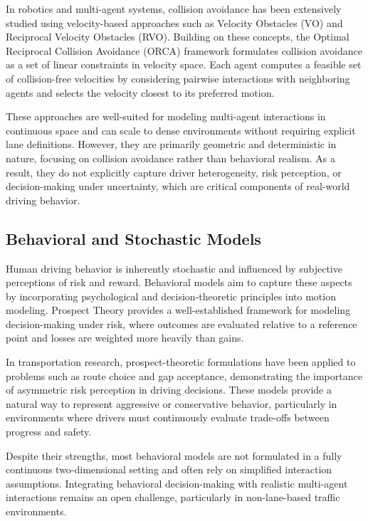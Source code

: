 \documentclass[conference]{IEEEtran}
\begin{document}
In robotics and multi-agent systems, collision avoidance has been extensively studied using velocity-based approaches such as Velocity Obstacles (VO) and Reciprocal Velocity Obstacles (RVO). Building on these concepts, the Optimal Reciprocal Collision Avoidance (ORCA) framework \cite{berg2008reciprocal, berg2011reciprocal} formulates collision avoidance as a set of linear constraints in velocity space. Each agent computes a feasible set of collision-free velocities by considering pairwise interactions with neighboring agents and selects the velocity closest to its preferred motion.

These approaches are well-suited for modeling multi-agent interactions in continuous space and can scale to dense environments without requiring explicit lane definitions. However, they are primarily geometric and deterministic in nature, focusing on collision avoidance rather than behavioral realism. As a result, they do not explicitly capture driver heterogeneity, risk perception, or decision-making under uncertainty, which are critical components of real-world driving behavior.

\subsection{Behavioral and Stochastic Models}
Human driving behavior is inherently stochastic and influenced by subjective perceptions of risk and reward. Behavioral models aim to capture these aspects by incorporating psychological and decision-theoretic principles into motion modeling. Prospect Theory \cite{kahneman1979prospect} provides a well-established framework for modeling decision-making under risk, where outcomes are evaluated relative to a reference point and losses are weighted more heavily than gains.

In transportation research, prospect-theoretic formulations have been applied to problems such as route choice and gap acceptance, demonstrating the importance of asymmetric risk perception in driving decisions. These models provide a natural way to represent aggressive or conservative behavior, particularly in environments where drivers must continuously evaluate trade-offs between progress and safety.

Despite their strengths, most behavioral models are not formulated in a fully continuous two-dimensional setting and often rely on simplified interaction assumptions. Integrating behavioral decision-making with realistic multi-agent interactions remains an open challenge, particularly in non-lane-based traffic environments.
\end{document}
